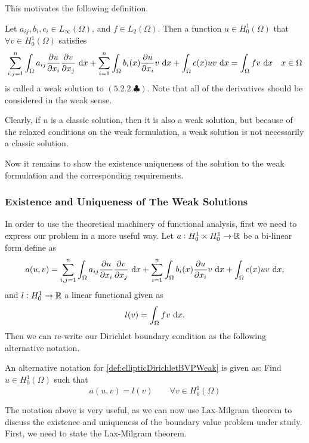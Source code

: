 This motivates the following definition.

\begin{definition}
	\label{def:ellipticDirichletBVPWeak}
	Let $ a_{ij}, b_i, c_i \in L_\infty(\Omega) $, and $ f \in L_2(\Omega) $. Then a function $ u \in H_0^1(\Omega) $ that $ \forall v \in H_0^1(\Omega) $ satisfies
	\[ \sum_{i,j=1}^{n}\int_\Omega a_{ij}\frac{\partial u}{\partial x_i} \frac{\partial v}{\partial x_j}\, \operatorname{d}\!x +\sum_{i=1}^{n} \int_\Omega b_i(x) \frac{\partial u}{\partial x_i} v\, \operatorname{d}\!x + \int_\Omega c(x) u v\, \operatorname{d}\!x = \int_\Omega fv\, \operatorname{d}\!x \quad x\in \Omega  \]
	is called a weak solution to $ (5.2.2.\clubsuit) $. Note that all of the derivatives should be considered in the weak sense. 
\end{definition}
\begin{remark}
	Clearly, if $ u $ is a classic solution, then it is also a weak solution, but because of the relaxed conditions on the weak formulation, a weak solution is not necessarily a classic solution.
\end{remark}
Now it remains to show the existence uniqueness of the solution to the weak formulation and the corresponding requirements. 

\subsubsection{Existence and Uniqueness of The Weak Solutions}
In order to use the theoretical machinery of functional analysis, first we need to express our problem in a more useful way. Let $ a: H_0^1 \times H_0^1 \to \mathbb{R}$ be a bi-linear form define as
\[ a(u,v) =  \sum_{i,j=1}^{n}\int_\Omega a_{ij}\frac{\partial u}{\partial x_i} \frac{\partial v}{\partial x_j}\, \operatorname{d}\!x +\sum_{i=1}^{n} \int_\Omega b_i(x) \frac{\partial u}{\partial x_i} v\, \operatorname{d}\!x + \int_\Omega c(x) u v\, \operatorname{d}\!x, \]
and $ l: H_0^1 \to \mathbb{R} $ a linear functional given as
\[ l(v) = \int_\Omega fv\, \operatorname{d}\!x. \]
Then we can re-write our Dirichlet boundary condition as the following alternative notation.
\begin{definition}
	An alternative notation for \autoref{def:ellipticDirichletBVPWeak} is given as: Find $ u \in H_0^1(\Omega) $ such that 
	\[ a(u,v) = l(v) \qquad \forall v \in H_0^1(\Omega) \]
\end{definition}

The notation above is very useful, as we can now use Lax-Milgram theorem to discuss the existence and uniqueness of the boundary value problem under study. First, we need to state the Lax-Milgram theorem.

